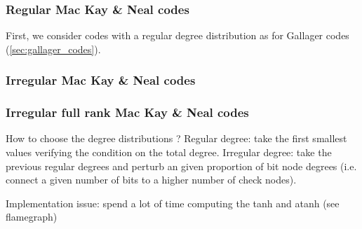 \subsubsection{Regular Mac Kay \& Neal codes}
First, we consider codes with a regular degree distribution as for Gallager
codes (\autoref{sec:gallager_codes}).

\subsubsection{Irregular Mac Kay \& Neal codes}

\subsubsection{Irregular full rank Mac Kay \& Neal codes}


How to choose the degree distributions ? Regular degree: take the first smallest
values verifying the condition on the total degree. Irregular degree: take the
previous regular degrees and perturb an given proportion of bit node degrees
(i.e. connect a given number of bits to a higher number of check nodes).

Implementation issue: spend a lot of time computing the tanh and atanh (see
flamegraph)